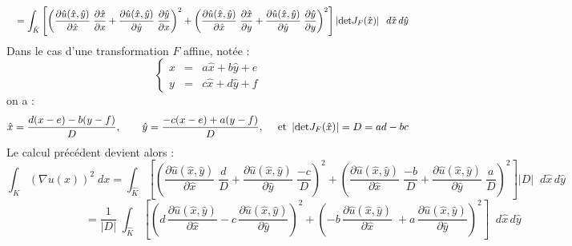 %
$$
\quad
= \int_{\hat{K}} \left[ \left(\frac{\partial \hat{u}(\hat{x},\hat{y})}{\partial
 \hat{x}} \;  \frac{\partial \hat{x}}{\partial x} + \frac{\partial \hat{u}(\hat{x},\hat{y})}{\partial \hat{y}} \; \frac{\partial \hat{y}}{\partial x} \right)^2 + 
\left(\frac{\partial \hat{u}(\hat{x},\hat{y})}{\partial \hat{x}} \;  \frac{\partial \hat{x}}{\partial y} + \frac{\partial \hat{u}(\hat{x},\hat{y})}{\partial \hat{y}} \; \frac{\partial \hat{y}}{\partial y} \right)^2 \right] \left| \hbox{det} J_F(\hat{x}) \right| \; \; d\hat{x}\, d\hat{y}
\vspace*{5 mm}
$$
%
Dans le cas d'une transformation $F$ affine, not\'ee :
$$
\left\{
\begin{array}{lll}
x & = & a\hat{x} + b\hat{y} + e\\
y & = & c\hat{x} + d\hat{y} + f
\end{array}
\right.
$$
on a :
$$
\hat{x} = \frac{d(x-e)-b(y-f)}{D},\qquad 
\hat{y} = \frac{-c(x-e)+a(y-f)}{D},\quad \hbox{ et }
\left| \hbox{det} J_F(\hat{x}) \right| = D = ad-bc
\vspace*{5 mm}
$$
%
Le calcul pr\'ec\'edent devient alors :
$$
\int_K (\nabla u(x))^2\; dx = \int_{\hat{K}} \left[ \left(\frac{\partial \hat{u}(\hat{x},\hat{y})}{\partial \hat{x}} \;  \frac{d}{D} + \frac{\partial \hat{u}(\hat{x},\hat{y})}{\partial \hat{y}} \; \frac{-c}{D} \right)^2 + 
\left(\frac{\partial \hat{u}(\hat{x},\hat{y})}{\partial \hat{x}} \;  \frac{-b}{D} + \frac{\partial \hat{u}(\hat{x},\hat{y})}{\partial \hat{y}} \; \frac{a}{D} \right)^2 \right] |D| \; \; d\hat{x}\, d\hat{y}
$$
%
$$
\qquad\qquad\quad\qquad = \frac{1}{|D|}\; \int_{\hat{K}} \left[ \left( d\, \frac{\partial \hat{u}(\hat{x},\hat{y})}{\partial \hat{x}} - c\, \frac{\partial \hat{u}(\hat{x},\hat{y})}{\partial \hat{y}} \right)^2 + 
\left(-b\, \frac{\partial \hat{u}(\hat{x},\hat{y})}{\partial \hat{x}} \; + a\, \frac{\partial \hat{u}(\hat{x},\hat{y})}{\partial \hat{y}} \right)^2 \right]  \; \; d\hat{x}\, d\hat{y}
$$





